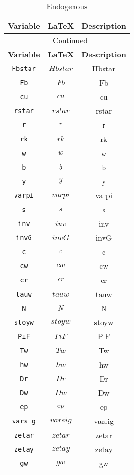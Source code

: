 \begin{center}
\begin{longtable}{ccc}
\caption{Endogenous}\\%
\hline%
\multicolumn{1}{c}{\textbf{Variable}} &
\multicolumn{1}{c}{\textbf{\LaTeX}} &
\multicolumn{1}{c}{\textbf{Description}}\\%
\hline\hline%
\endfirsthead
\multicolumn{3}{c}{{\tablename} \thetable{} -- Continued}\\%
\hline%
\multicolumn{1}{c}{\textbf{Variable}} &
\multicolumn{1}{c}{\textbf{\LaTeX}} &
\multicolumn{1}{c}{\textbf{Description}}\\%
\hline\hline%
\endhead
\texttt{Hbstar} & $Hbstar$ & Hbstar\\
\texttt{Fb} & $Fb$ & Fb\\
\texttt{cu} & $cu$ & cu\\
\texttt{rstar} & $rstar$ & rstar\\
\texttt{r} & $r$ & r\\
\texttt{rk} & $rk$ & rk\\
\texttt{w} & $w$ & w\\
\texttt{b} & $b$ & b\\
\texttt{y} & $y$ & y\\
\texttt{varpi} & $varpi$ & varpi\\
\texttt{s} & $s$ & s\\
\texttt{inv} & $inv$ & inv\\
\texttt{invG} & $invG$ & invG\\
\texttt{c} & $c$ & c\\
\texttt{cw} & $cw$ & cw\\
\texttt{cr} & $cr$ & cr\\
\texttt{tauw} & $tauw$ & tauw\\
\texttt{N} & $N$ & N\\
\texttt{stoyw} & $stoyw$ & stoyw\\
\texttt{PiF} & $PiF$ & PiF\\
\texttt{Tw} & $Tw$ & Tw\\
\texttt{hw} & $hw$ & hw\\
\texttt{Dr} & $Dr$ & Dr\\
\texttt{Dw} & $Dw$ & Dw\\
\texttt{ep} & $ep$ & ep\\
\texttt{varsig} & $varsig$ & varsig\\
\texttt{zetar} & $zetar$ & zetar\\
\texttt{zetay} & $zetay$ & zetay\\
\texttt{gw} & $gw$ & gw\\

\end{longtable}
\end{center}
